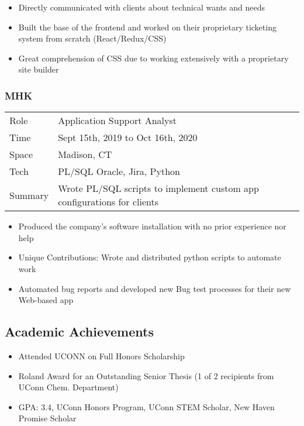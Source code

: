 \documentclass[letterpaper]{article}
\providecommand{\tightlist}{%
  \setlength{\itemsep}{0pt}\setlength{\parskip}{0pt}}
\begin{document}
\begin{itemize}
\tightlist
\item
  Directly communicated with clients about technical wants and needs
\item
  Built the base of the frontend and worked on their proprietary
  ticketing system from scratch (React/Redux/CSS)
\item
  Great comprehension of CSS due to working extensively with a
  proprietary site builder
\end{itemize}

\hypertarget{mhk}{%
\subsubsection{MHK}\label{mhk}}

\begin{longtable}[]{@{}
  >{\raggedright\arraybackslash}p{}
  >{\raggedright\arraybackslash}p{}@{}}
\toprule\noalign{}
\endhead
\bottomrule\noalign{}
\endlastfoot
Role & Application Support Analyst \\
Time & Sept 15th, 2019 to Oct 16th, 2020 \\
Space & Madison, CT \\
Tech & PL/SQL Oracle, Jira, Python \\
Summary & Wrote PL/SQL scripts to implement custom app configurations
for clients \\
\end{longtable}

\begin{itemize}
\tightlist
\item
  Produced the company's software installation with no prior experience
  nor help
\item
  Unique Contributions: Wrote and distributed python scripts to automate
  work
\item
  Automated bug reports and developed new Bug test processes for their
  new Web-based app
\end{itemize}

\hypertarget{academic-achievements}{%
\subsection{Academic Achievements}\label{academic-achievements}}

\begin{itemize}
\tightlist
\item
  Attended UCONN on Full Honors Scholarship
\item
  Roland Award for an Outstanding Senior Thesis (1 of 2 recipients from
  UConn Chem. Department)
\item
  GPA: 3.4, UConn Honors Program, UConn STEM Scholar, New Haven Promise
  Scholar
\end{itemize}
\end{document}
